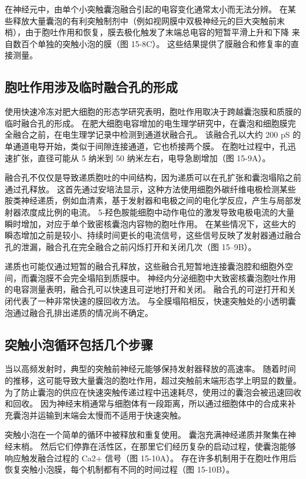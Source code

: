 在神经元中，由单个小突触囊泡融合引起的电容变化通常太小而无法分辨。 在某些释放大量囊泡的有利突触制剂中（例如视网膜中双极神经元的巨大突触前末梢），由于胞吐作用和恢复，膜去极化触发了末端总电容的短暂平滑上升和下降 来自数百个单独的突触小泡的膜（图 15-8C）。 这些结果提供了膜融合和修复率的直接测量。

\subsection{胞吐作用涉及临时融合孔的形成}
使用快速冷冻对肥大细胞的形态学研究表明，胞吐作用取决于跨越囊泡膜和质膜的临时融合孔的形成。 在肥大细胞电容增加的电生理学研究中，在囊泡和细胞膜完全融合之前，在电生理学记录中检测到通道状融合孔。 该融合孔以大约 200 pS 的单通道电导开始，类似于间隙连接通道，它也桥接两个膜。 在胞吐过程中，孔迅速扩张，直径可能从 5 纳米到 50 纳米左右，电导急剧增加（图 15-9A）。

融合孔不仅仅是导致递质胞吐的中间结构，因为递质可以在孔扩张和囊泡塌陷之前通过孔释放。 这首先通过安培法显示，这种方法使用细胞外碳纤维电极检测某些胺类神经递质，例如血清素，基于发射器和电极之间的电化学反应，产生与局部发射器浓度成比例的电流。 5-羟色胺能细胞中动作电位的激发导致电极电流的大量瞬时增加，对应于单个致密核囊泡内容物的胞吐作用。 在某些情况下，这些大的瞬态增加之前是较小、持续时间更长的电流信号，这些信号反映了发射器通过融合孔的泄漏，融合孔在完全融合之前闪烁打开和关闭几次（图 15–9B）。

递质也可能仅通过短暂的融合孔释放，这些融合孔短暂地连接囊泡腔和细胞外空间，而囊泡膜不会完全塌陷到质膜中。 神经内分泌细胞中大致密核囊泡胞吐作用的电容测量表明，融合孔可以快速且可逆地打开和关闭。 融合孔的可逆打开和关闭代表了一种非常快速的膜回收方法。 与全膜塌陷相反，快速突触处的小透明囊泡通过融合孔排出递质的情况尚不确定。

\subsection{突触小泡循环包括几个步骤}

当以高频发射时，典型的突触前神经元能够保持发射器释放的高速率。 随着时间的推移，这可能导致大量囊泡的胞吐作用，超过突触前末端形态学上明显的数量。 为了防止囊泡的供应在快速突触传递过程中迅速耗尽，使用过的囊泡会被迅速回收和回收。 因为神经末梢通常与细胞体有一段距离，所以通过细胞体中的合成来补充囊泡并运输到末端会太慢而不适用于快速突触。

突触小泡在一个简单的循环中被释放和重复使用。 囊泡充满神经递质并聚集在神经末梢。 然后它们停靠在活性区，在那里它们经历复杂的启动过程，使囊泡能够响应触发融合过程的 Ca2+ 信号（图 15-10A）。 存在许多机制用于在胞吐作用后恢复突触小泡膜，每个机制都有不同的时间过程（图 15-10B）。

